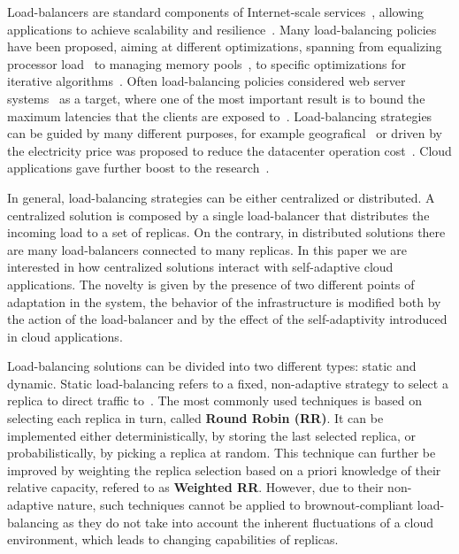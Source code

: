 Load-balancers are standard components of Internet-scale
services~\cite{WangOSDI}, allowing applications to achieve scalability
and resilience~\citep{Barroso09, Hamilton07:LISA,
  clusteredbalancing}. Many load-balancing policies have been
proposed, aiming at different optimizations, spanning from equalizing
processor load~\cite{Stankovic:TC} to managing memory
pools~\cite{PattersonMemoryLB,MemoryLBACC}, to specific optimizations
for iterative algorithms~\cite{BahiIterative}. Often load-balancing
policies considered web server systems~\cite{CLB,Cardellini2003} as a
target, where one of the most important result is to bound the maximum
latencies that the clients are exposed
to~\cite{TC-Abdelzaher}. Load-balancing strategies can be guided by
many different purposes, for example
geografical~\cite{GeograficalSASO,geographicalwanbalancing} or driven
by the electricity price was proposed to reduce the datacenter
operation cost~\cite{LoadBalancingForElectricity:TCC}. Cloud
applications gave further boost to the
research~\citep{Barroso09,Lu11:PerfEval,Lin12:IGCC}.

In general, load-balancing strategies can be either centralized or
distributed. A centralized solution is composed by a single
load-balancer that distributes the incoming load to a set of
replicas. On the contrary, in distributed solutions there are many
load-balancers connected to many replicas. In this paper we are
interested in how centralized solutions interact with self-adaptive
cloud applications. The novelty is given by the presence of two
different points of adaptation in the system, the behavior of the
infrastructure is modified both by the action of the load-balancer and
by the effect of the self-adaptivity introduced in cloud applications.

Load-balancing solutions can be divided into two different types:
static and dynamic. Static load-balancing refers to a fixed,
non-adaptive strategy to select a replica to direct traffic
to~\cite{StaticLoadBalancing:TSE,StaticOptimal:ACM}.  The most
commonly used techniques is based on selecting each replica in turn,
called \textbf{Round Robin (RR)}. It can be implemented either
deterministically, by storing the last selected replica, or
probabilistically, by picking a replica at random.  This technique can
further be improved by weighting the replica selection based on a
priori knowledge of their relative capacity, refered to as
\textbf{Weighted RR}.  However, due to their non-adaptive nature, such
techniques cannot be applied to brownout-compliant load-balancing as
they do not take into account the inherent fluctuations of a cloud
environment, which leads to changing capabilities of replicas.

